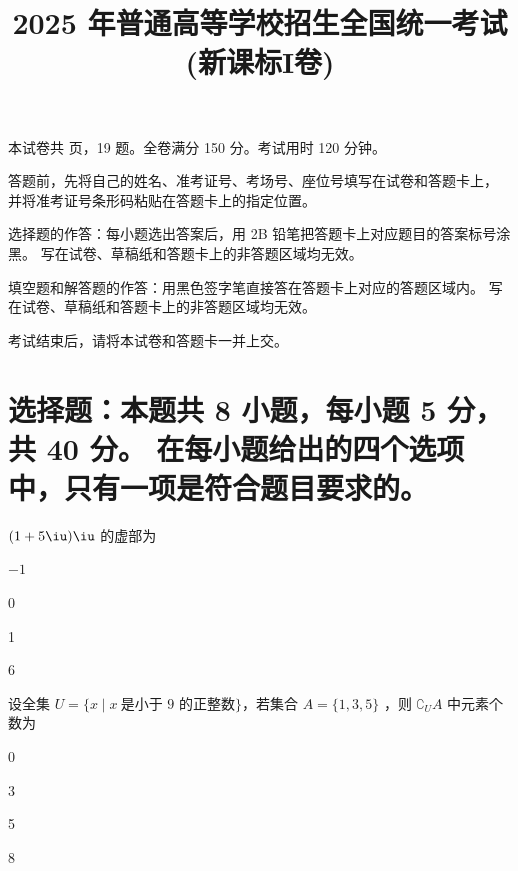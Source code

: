 \documentclass{exam-zh}
\title{2025 年普通高等学校招生全国统一考试(新课标I卷)}
\begin{document}

\secret

\maketitle
\begin{center}
    本试卷共 \pageref{LastPage} 页，19 题。全卷满分 150 分。考试用时 120 分钟。
\end{center}


\begin{notice}
  \item 答题前，先将自己的姓名、准考证号、考场号、座位号填写在试卷和答题卡上，
    并将准考证号条形码粘贴在答题卡上的指定位置。
  \item 选择题的作答：每小题选出答案后，用 2B 铅笔把答题卡上对应题目的答案标号涂黑。
    写在试卷、草稿纸和答题卡上的非答题区域均无效。
  \item 填空题和解答题的作答：用黑色签字笔直接答在答题卡上对应的答题区域内。
    写在试卷、草稿纸和答题卡上的非答题区域均无效。
  \item 考试结束后，请将本试卷和答题卡一并上交。
\end{notice}



\section{
  选择题：本题共 8 小题，每小题 5 分，共 40 分。
  在每小题给出的四个选项中，只有一项是符合题目要求的。
}

\begin{question}
  $(1+5 \iu) \iu$ 的虚部为 \paren
  \begin{choices}
    \item $-1$
    \item 0
    \item 1
    \item 6
  \end{choices}
\end{question}

\begin{question}
  设全集 $U=\{x \mid x~ \text{是小于 9 的正整数}\}$，若集合 $A=\{1,3,5\}$ ，则 $\complement_U A$ 中元素个数为 \paren
  \begin{choices}
    \item 0
    \item 3
    \item 5
    \item 8
  \end{choices}
\end{question}
\end{document}
